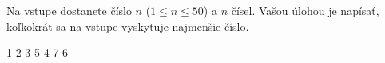 




Na vstupe dostanete číslo $n$ ($1\leq n\leq 50$) a $n$ čísel. Vašou úlohou je napísať, koľkokrát sa
na vstupe vyskytuje najmenšie číslo.

1 2 3 5 4 7 6
\koniec


